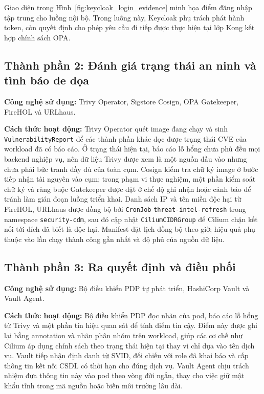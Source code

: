 Giao diện trong Hình~\ref{fig:keycloak_login_evidence} minh họa điểm đăng nhập tập trung cho luồng nội bộ. Trong luồng này, Keycloak phụ trách phát hành token, còn quyết định cho phép yêu cầu đi tiếp được thực hiện tại lớp Kong kết hợp chính sách OPA.

\subsection{Thành phần 2: Đánh giá trạng thái an ninh và tình báo đe dọa}

\textbf{Công nghệ sử dụng:} Trivy Operator, Sigstore Cosign, OPA Gatekeeper, FireHOL và URLhaus.

\textbf{Cách thức hoạt động:} Trivy Operator quét image đang chạy và sinh \texttt{VulnerabilityReport} để các thành phần khác đọc được trạng thái CVE của workload đã có báo cáo. Ở trạng thái hiện tại, báo cáo lỗ hổng chưa phủ đều mọi backend nghiệp vụ, nên dữ liệu Trivy được xem là một nguồn đầu vào nhưng chưa phải bức tranh đầy đủ của toàn cụm. Cosign kiểm tra chữ ký image ở bước tiếp nhận tài nguyên vào cụm; trong phạm vi thực nghiệm, một phần kiểm soát chữ ký và ràng buộc Gatekeeper được đặt ở chế độ ghi nhận hoặc cảnh báo để tránh làm gián đoạn luồng triển khai. Danh sách IP và tên miền độc hại từ FireHOL, URLhaus được đồng bộ bởi \texttt{CronJob} \texttt{threat-intel-refresh} trong namespace \texttt{security-cdm}, sau đó cập nhật \texttt{CiliumCIDRGroup} để Cilium chặn kết nối tới đích đã biết là độc hại. Manifest đặt lịch đồng bộ theo giờ; hiệu quả phụ thuộc vào lần chạy thành công gần nhất và độ phủ của nguồn dữ liệu.

\subsection{Thành phần 3: Ra quyết định và điều phối}

\textbf{Công nghệ sử dụng:} Bộ điều khiển PDP tự phát triển, HashiCorp Vault và Vault Agent.

\textbf{Cách thức hoạt động:} Bộ điều khiển PDP đọc nhãn của pod, báo cáo lỗ hổng từ Trivy và một phần tín hiệu quan sát để tính điểm tin cậy. Điểm này được ghi lại bằng annotation và nhãn phân nhóm trên workload, giúp các cơ chế như Cilium áp dụng chính sách theo trạng thái hiện tại thay vì chỉ dựa vào tên dịch vụ. Vault tiếp nhận định danh từ SVID, đối chiếu với role đã khai báo và cấp thông tin kết nối CSDL có thời hạn cho đúng dịch vụ. Vault Agent chịu trách nhiệm đưa thông tin này vào pod theo vòng đời ngắn, thay cho việc giữ mật khẩu tĩnh trong mã nguồn hoặc biến môi trường lâu dài.

